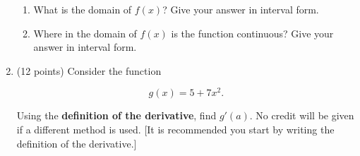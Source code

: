 \documentclass[11pt]{article}
\renewcommand{\d}{\displaystyle}
\begin{document}
\begin{enumerate}
\newlength{\mysep} 
\setlength{\mysep}{0.3in}
\begin{enumerate}

\vspace{1cm}

\item What is the domain of $f(x)$? Give your answer in interval form.\\

\vfill

\item Where in the domain of $f(x)$ is the function continuous? Give your answer in interval form.
\vfill

\vspace{\mysep}
\end{enumerate}
\newpage


\item (12 points) Consider the function

$$
g(x) = 5 + 7x^2.
$$

Using the \textbf{definition of the derivative}, find $g'(a)$. No credit will be given if a different method is used. [It is recommended you start by writing the definition of the derivative.] 


\end{enumerate}
\end{document}
